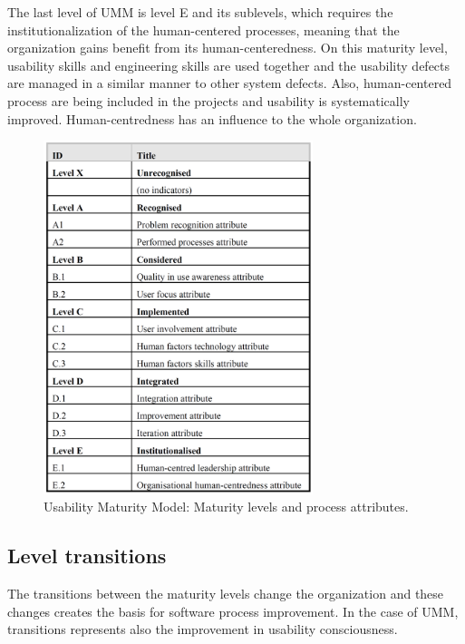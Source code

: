 \documentclass[12pt,a4paper,oneside,pdftex]{report}
\begin{document}
 The last level of UMM is level E and its sublevels, which requires the institutionalization of the human-centered processes, meaning that the organization gains benefit from its human-centeredness. On this maturity level, usability skills and engineering skills are used together and the usability defects are managed in a similar manner to other system defects. Also, human-centered process are being included in the projects and usability is systematically improved. Human-centredness has an influence to the whole organization. \cite{RefWorks:30}

\begin{figure}[H]
  	\centering
  	\includegraphics[width=0.7\textwidth]{./images/umm_levels.png}\hspace*{4cm}
  	\caption{Usability Maturity Model: Maturity levels and process attributes. \cite{RefWorks:30}}
	\label{fig:umm}
\end{figure}

\subsection{Level transitions}

The transitions between the maturity levels change the organization and these changes creates the basis for software process improvement. In the case of UMM, transitions represents also the improvement in usability consciousness. 
\end{document}
